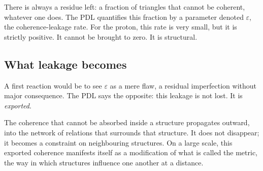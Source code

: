 \documentclass[11pt, a4paper, openright]{book}
\begin{document}
\medskip

There is always a residue left: a fraction of triangles that cannot be coherent, whatever one does. The PDL quantifies this fraction by a parameter denoted $\varepsilon$, the coherence-leakage rate. For the proton, this rate is very small, but it is strictly positive. It cannot be brought to zero. It is structural.

\subsection*{What leakage becomes}

A first reaction would be to see $\varepsilon$ as a mere flaw, a residual imperfection without major consequence. The PDL says the opposite: this leakage is not lost. It is \emph{exported}.

\medskip

The coherence that cannot be absorbed inside a structure propagates outward, into the network of relations that surrounds that structure. It does not disappear; it becomes a constraint on neighbouring structures. On a large scale, this exported coherence manifests itself as a modification of what is called the metric, the way in which structures influence one another at a distance.

\medskip
\end{document}
